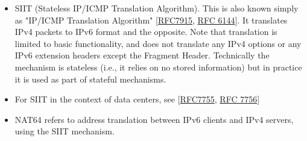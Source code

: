 \documentclass[
]{article}
\begin{document}
\begin{itemize}
\item
  SIIT (Stateless IP/ICMP Translation Algorithm). This is also known
  simply as "IP/ICMP Translation Algorithm"
  {[}\href{https://www.rfc-editor.org/info/rfc7915}{RFC7915},
  \href{https://www.rfc-editor.org/info/rfc6144}{RFC 6144}{]}. It
  translates IPv4 packets to IPv6 format and the opposite. Note that
  translation is limited to basic functionality, and does not translate
  any IPv4 options or any IPv6 extension headers except the Fragment
  Header. Technically the mechanism is stateless (i.e., it relies on no
  stored information) but in practice it is used as part of stateful
  mechanisms.
\item
  For SIIT in the context of data centers, see
  {[}\href{https://www.rfc-editor.org/info/rfc7755}{RFC7755},
  \href{https://www.rfc-editor.org/info/rfc7756}{RFC 7756}{]}
\item
  NAT64 refers to address translation between IPv6 clients and IPv4
  servers, using the SIIT mechanism.


\end{itemize}
\end{document}
